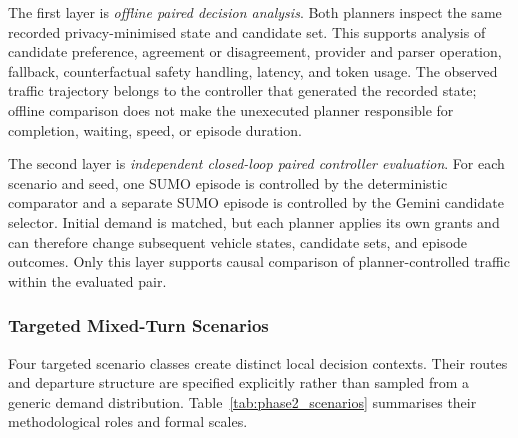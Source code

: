 \documentclass[letterpaper,10pt,conference]{ieeeconf}
\begin{document}
The first layer is \emph{offline paired decision analysis}. Both planners inspect the same recorded privacy-minimised state and candidate set. This supports analysis of candidate preference, agreement or disagreement, provider and parser operation, fallback, counterfactual safety handling, latency, and token usage. The observed traffic trajectory belongs to the controller that generated the recorded state; offline comparison does not make the unexecuted planner responsible for completion, waiting, speed, or episode duration.



The second layer is \emph{independent closed-loop paired controller evaluation}. For each scenario and seed, one SUMO episode is controlled by the deterministic comparator and a separate SUMO episode is controlled by the Gemini candidate selector. Initial demand is matched, but each planner applies its own grants and can therefore change subsequent vehicle states, candidate sets, and episode outcomes. Only this layer supports causal comparison of planner-controlled traffic within the evaluated pair.



\subsubsection{Targeted Mixed-Turn Scenarios}



Four targeted scenario classes create distinct local decision contexts. Their routes and departure structure are specified explicitly rather than sampled from a generic demand distribution. Table~\ref{tab:phase2_scenarios} summarises their methodological roles and formal scales.
\end{document}
